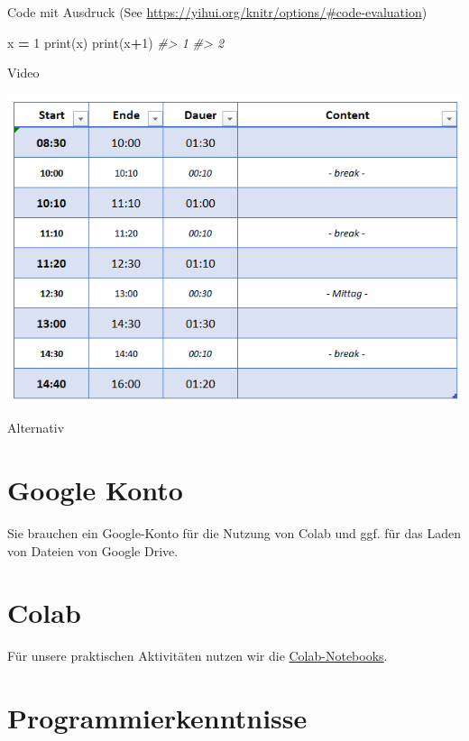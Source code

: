 \documentclass[
]{book}
\newenvironment{Shaded}{\begin{snugshade}}{\end{snugshade}}
\newcommand{\BuiltInTok}[1]{#1}
\newcommand{\CommentTok}[1]{\textcolor[rgb]{0.56,0.35,0.01}{\textit{#1}}}
\newcommand{\DecValTok}[1]{\textcolor[rgb]{0.00,0.00,0.81}{#1}}
\newcommand{\NormalTok}[1]{#1}
\newcommand{\OperatorTok}[1]{\textcolor[rgb]{0.81,0.36,0.00}{\textbf{#1}}}
\theoremstyle{definition}
\theoremstyle{definition}
\theoremstyle{definition}
\theoremstyle{definition}
\theoremstyle{remark}
\begin{document}
Code mit Ausdruck (See \url{https://yihui.org/knitr/options/\#code-evaluation})

\begin{Shaded}
\begin{Highlighting}[]
\NormalTok{x }\OperatorTok{=} \DecValTok{1}
\BuiltInTok{print}\NormalTok{(x)}
\BuiltInTok{print}\NormalTok{(x}\OperatorTok{+}\DecValTok{1}\NormalTok{)}
\CommentTok{\#\textgreater{} 1}
\CommentTok{\#\textgreater{} 2}
\end{Highlighting}
\end{Shaded}

Video

\href{https://youtu.be/Gow7p-rl2HE}{\includegraphics{assets/x.png}}

Alternativ

\hypertarget{google-konto}{%
\section{Google Konto}\label{google-konto}}

Sie brauchen ein Google-Konto für die Nutzung von Colab und ggf. für das Laden von Dateien von Google Drive.

\hypertarget{colab}{%
\section{Colab}\label{colab}}

Für unsere praktischen Aktivitäten nutzen wir die \href{https://colab.research.google.com/}{Colab-Notebooks}.

\hypertarget{programmierkenntnisse}{%
\section{Programmierkenntnisse}\label{programmierkenntnisse}}
\end{document}
